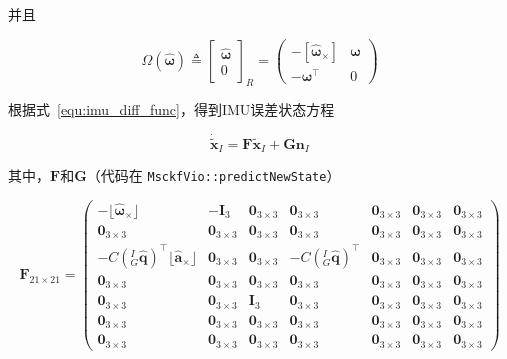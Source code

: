 \documentclass[12pt,a4paper]{article}
\begin{document}
并且

\begin{equation*}
\Omega\left(\hat{\boldsymbol{\omega}}\right) 
\triangleq 
{\begin{bmatrix}
\hat{\boldsymbol{\omega}} \\ 0
\end{bmatrix}}_R
= 
\begin{pmatrix}
-[\hat{\boldsymbol{\omega}}_\times] & \boldsymbol{\omega} \\
-\boldsymbol{\omega}^\top & 0
\end{pmatrix}
\end{equation*}

根据式~\eqref{equ:imu_diff_func}，得到IMU误差状态方程

\begin{equation}
\dot{\tilde{\mathbf{x}}}_I = 
\mathbf{F} \tilde{\mathbf{x}}_I + 
\mathbf{G} \mathbf{n}_I
\end{equation}

其中，$\mathbf{F}$和$\mathbf{G}$（代码在 \verb|MsckfVio::predictNewState|）

\begin{equation*}
\mathbf{F}_{21 \times 21} = 
\begin{pmatrix}
-\lfloor\hat{\boldsymbol{\omega}}{}_{\times}\rfloor & -\mathbf{I}_3 & 
\mathbf{0}_{3\times 3} & \mathbf{0}_{3\times 3} & \mathbf{0}_{3\times 3} & \mathbf{0}_{3\times 3} & \mathbf{0}_{3\times 3} \\
\mathbf{0}_{3\times 3} & \mathbf{0}_{3\times 3} & \mathbf{0}_{3\times 3} & 
\mathbf{0}_{3\times 3} & \mathbf{0}_{3\times 3} & \mathbf{0}_{3\times 3} & \mathbf{0}_{3\times 3} \\
-C\left({}^I_G\hat{\mathbf{q}}\right)^\top\lfloor\hat{\mathbf{a}}{}_{\times}\rfloor & 
\mathbf{0}_{3\times 3} & \mathbf{0}_{3\times 3} & 
-C\left({}^I_G\hat{\mathbf{q}}\right)^\top & \mathbf{0}_{3\times 3} & \mathbf{0}_{3\times 3} & \mathbf{0}_{3\times 3} \\
\mathbf{0}_{3\times 3} & \mathbf{0}_{3\times 3} & \mathbf{0}_{3\times 3} & 
\mathbf{0}_{3\times 3} & \mathbf{0}_{3\times 3} & \mathbf{0}_{3\times 3} & \mathbf{0}_{3\times 3} \\
\mathbf{0}_{3\times 3} & \mathbf{0}_{3\times 3} & \mathbf{I}_3 & 
\mathbf{0}_{3\times 3} & \mathbf{0}_{3\times 3} & \mathbf{0}_{3\times 3} & \mathbf{0}_{3\times 3} \\
\mathbf{0}_{3\times 3} & \mathbf{0}_{3\times 3} & \mathbf{0}_{3\times 3} & 
\mathbf{0}_{3\times 3} & \mathbf{0}_{3\times 3} & \mathbf{0}_{3\times 3} & \mathbf{0}_{3\times 3} \\
\mathbf{0}_{3\times 3} & \mathbf{0}_{3\times 3} & \mathbf{0}_{3\times 3} & 
\mathbf{0}_{3\times 3} & \mathbf{0}_{3\times 3} & \mathbf{0}_{3\times 3} & \mathbf{0}_{3\times 3}
\end{pmatrix}
\end{equation*}
\end{document}
